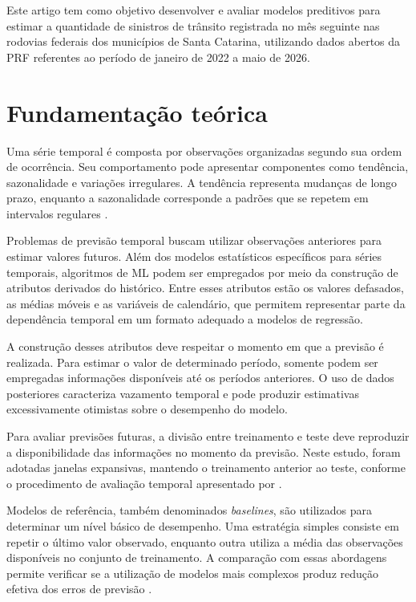 \documentclass[12pt]{article}
\begin{document}
Este artigo tem como objetivo desenvolver e avaliar modelos preditivos para estimar a quantidade de sinistros de trânsito registrada no mês seguinte nas rodovias federais dos municípios de Santa Catarina, utilizando dados abertos da PRF referentes ao período de janeiro de 2022 a maio de 2026.


\section{Fundamentação teórica}

Uma série temporal é composta por observações organizadas segundo sua ordem de ocorrência. Seu comportamento pode apresentar componentes como tendência, sazonalidade e variações irregulares. A tendência representa mudanças de longo prazo, enquanto a sazonalidade corresponde a padrões que se repetem em intervalos regulares \cite{hyndman2021forecasting}.

Problemas de previsão temporal buscam utilizar observações anteriores para estimar valores futuros. Além dos modelos estatísticos específicos para séries temporais, algoritmos de ML podem ser empregados por meio da construção de atributos derivados do histórico. Entre esses atributos estão os valores defasados, as médias móveis e as variáveis de calendário, que permitem representar parte da dependência temporal em um formato adequado a modelos de regressão.

A construção desses atributos deve respeitar o momento em que a previsão é realizada. Para estimar o valor de determinado período, somente podem ser empregadas informações disponíveis até os períodos anteriores. O uso de dados posteriores caracteriza vazamento temporal e pode produzir estimativas excessivamente otimistas sobre o desempenho do modelo.

Para avaliar previsões futuras, a divisão entre treinamento e teste deve reproduzir a disponibilidade das informações no momento da previsão. Neste estudo, foram adotadas janelas expansivas, mantendo o treinamento anterior ao teste, conforme o procedimento de avaliação temporal apresentado por \cite{hyndman2021forecasting}.

Modelos de referência, também denominados \textit{baselines}, são utilizados para determinar um nível básico de desempenho. Uma estratégia simples consiste em repetir o último valor observado, enquanto outra utiliza a média das observações disponíveis no conjunto de treinamento. A comparação com essas abordagens permite verificar se a utilização de modelos mais complexos produz redução efetiva dos erros de previsão \cite{hyndman2021forecasting}.
\end{document}
